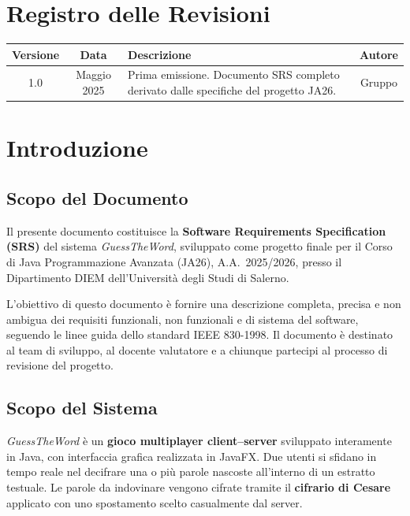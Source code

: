 \documentclass[12pt, a4paper]{article}
\begin{document}
\newpage
\section*{Registro delle Revisioni}

\begin{longtable}{|c|c|p{6cm}|c|}
    \hline
    \rowcolor{primaryBlue!20}
    \textbf{Versione} & \textbf{Data} & \textbf{Descrizione} & \textbf{Autore} \\
    \hline
    1.0 & Maggio 2025 & Prima emissione. Documento SRS completo derivato dalle specifiche del progetto JA26. & Gruppo \\
    \hline
\end{longtable}

\newpage
\tableofcontents

\newpage
\section{Introduzione}

\subsection{Scopo del Documento}

Il presente documento costituisce la \textbf{Software Requirements Specification (SRS)} del sistema \textit{GuessTheWord}, sviluppato come progetto finale per il Corso di Java Programmazione Avanzata (JA26), A.A.\ 2025/2026, presso il Dipartimento DIEM dell'Università degli Studi di Salerno.

L'obiettivo di questo documento è fornire una descrizione completa, precisa e non ambigua dei requisiti funzionali, non funzionali e di sistema del software, seguendo le linee guida dello standard IEEE 830-1998. Il documento è destinato al team di sviluppo, al docente valutatore e a chiunque partecipi al processo di revisione del progetto.

\subsection{Scopo del Sistema}

\textit{GuessTheWord} è un \textbf{gioco multiplayer client–server} sviluppato interamente in Java, con interfaccia grafica realizzata in JavaFX. Due utenti si sfidano in tempo reale nel decifrare una o più parole nascoste all'interno di un estratto testuale. Le parole da indovinare vengono cifrate tramite il \textbf{cifrario di Cesare} applicato con uno spostamento scelto casualmente dal server.
\end{document}
